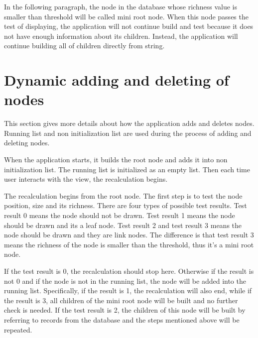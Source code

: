 \documentclass[MSc]{icldt}
\begin{document}
In the following paragraph, the node in the database whose richness value is smaller than threshold will be called mini root node. When this node passes the test of displaying, the application will not continue build and test because it does not have enough information about its children. Instead, the application will continue building all of children directly from string. 

\section{Dynamic adding and deleting of nodes}

This section gives more details about how the application adds and deletes nodes. Running list and non initialization list are used during the process of adding and deleting nodes.

When the application starts, it builds the root node and adds it into non initialization list. The running list is initialized as an empty list. Then each time user interacts with the view, the recalculation begins.

The recalculation begins from the root node. The first step is to test the node position, size and its richness. There are four types of possible test results. Test result 0 means the node should not be drawn. Test result 1 means the node should be drawn and its a leaf node. Test result 2 and test result 3 means the node should be drawn and they are link nodes. The difference is that test result 3 means the richness of the node is smaller than the threshold, thus it's a mini root node. 

If the test result is 0, the recalculation should stop here. Otherwise if the result is not 0 and if the node is not in the running list, the node will be added into the running list. Specifically, if the result is 1, the recalculation will also end, while if the result is 3, all children of the mini root node will be built and no further check is needed. If the test result is 2, the children of this node will be built by referring to records from the database and the steps mentioned above will be repeated.
\end{document}
